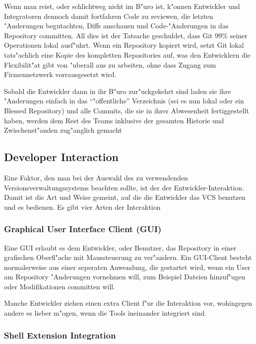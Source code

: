 Wenn man reist, oder schlichtweg nicht im B"uro ist, k"onnen Entwickler und Integratoren dennoch damit fortfahren Code zu reviewen, die letzten "Anderungen
begutachten, Diffs anschauen und Code-"Anderungen in das Repository committen. All dies ist der Tatsache geschuldet, dass Git 99\% seiner Operationen lokal
ausf"uhrt. Wenn ein Repository kopiert wird, setzt Git lokal tats"achlich eine Kopie des kompletten Repositories auf, was den Entwicklern die Flexibilit"at gibt von
"uberall aus zu arbeiten, ohne dass Zugang zum Firmennetzwerk vorrausgesetzt wird. 

Sobald die Entwickler dann in ihr B"uro zur"uckgekehrt sind laden sie ihre "Anderungen einfach in das ``"offentliche'' Verzeichnis (sei es nun lokal oder ein
Blessed Repository) und alle Commits, die sie in ihrer Abwesenheit fertiggestellt haben, werden dem Rest des Teams inklusive der gesamten Historie und 
Zwischenst"anden zug"anglich gemacht

\subsection{Developer Interaction}

Eine Faktor, den man bei der Auswahl des zu verwendenden Versionsverwaltungssystems beachten sollte, ist der der Entwickler-Interaktion. Damit ist die Art und Weise gemeint, auf die die Entwickler das VCS benutzen und es bedienen. Es gibt vier Arten der Interaktion

\subsubsection{Graphical User Interface Client (GUI)}


Eine GUI erlaubt es dem Entwickler, oder Benutzer, das Repository in einer grafischen Oberfl"ache mit Maussteuerung zu ver"andern. Ein GUI-Client besteht normalerweise aus einer seperaten Anwendung, die gestartet wird, wenn ein User am Repository "Anderungen vornehmen will, zum Beispiel Dateien hinzuf"ugen oder Modifikationen committen will. 

Manche Entwickler ziehen einen extra Client f"ur die Interaktion vor, wohingegen andere es lieber m"ogen, wenn die Tools ineinander integriert sind.

\subsubsection{Shell Extension Integration}

